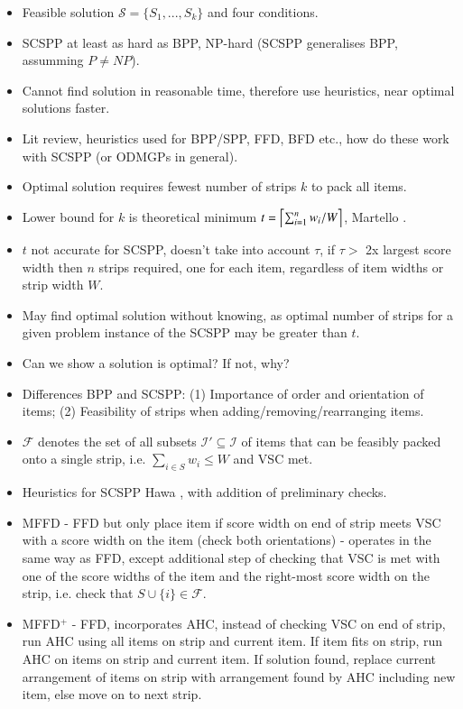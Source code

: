 \documentclass{elsarticle}
\begin{document}
\begin{itemize}
	\item Feasible solution $\mathcal{S} = \{S_1,...,S_k\}$ and four conditions.
	\item SCSPP at least as hard as BPP, NP-hard (SCSPP generalises BPP, assumming $P \neq NP$).
	\item Cannot find solution in reasonable time, therefore use heuristics, near optimal solutions faster.
	\item Lit review, heuristics used for BPP/SPP, FFD, BFD etc., how do these work with SCSPP (or ODMGPs in general).
	\item Optimal solution requires fewest number of strips $k$ to pack all items.
	\item Lower bound for $k$ is theoretical minimum $t = \ceil*{\sum_{i=1}^{n}w_i / W}$, Martello \cite{martello1990l}.
	\item $t$ not accurate for SCSPP, doesn't take into account $\tau$, if $\tau >$ 2x largest score width then $n$ strips required, one for each item, regardless of item widths or strip width $W$.
	\item May find optimal solution without knowing, as optimal number of strips for a given problem instance of the SCSPP may be greater than $t$.
	\item Can we show a solution is optimal? If not, why?
	\item Differences BPP and SCSPP: (1) Importance of order and orientation of items; (2) Feasibility of strips when adding/removing/rearranging items.
	\item $\mathcal{F}$ denotes the set of all subsets $\mathcal{I}' \subseteq \mathcal{I}$ of items that can be feasibly packed onto a single strip, i.e. $\sum_{i \in S} w_i \leq W$ and VSC met.
	\item Heuristics for SCSPP Hawa \cite{hawa2018}, with addition of preliminary checks.
	\item MFFD - FFD but only place item if score width on end of strip meets VSC with a score width on the item (check both orientations) - operates in the same way as FFD, except additional step of checking that VSC is met with one of the score widths of the item and the right-most score width on the strip, i.e. check that $S \cup \{i\} \in \mathcal{F}$.
	\item MFFD$^+$ - FFD, incorporates AHC, instead of checking VSC on end of strip, run AHC using all items on strip and current item. If item fits on strip, run AHC on items on strip and current item. If solution found, replace current arrangement of items on strip with arrangement found by AHC including new item, else move on to next strip.

\end{itemize}
\end{document}
